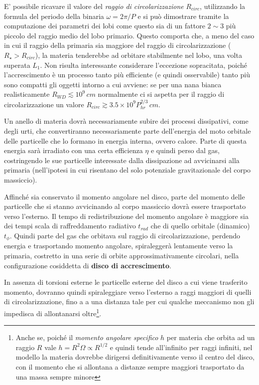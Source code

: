 \documentclass[a4paperbi]{article}
\begin{document}
	E' possibile ricavare il valore del \textit{raggio di circolarizzazione} $R_{circ}$, utilizzando la formula del periodo della binaria $\omega=2\pi/P$ e si può dimostrare tramite la computazione dei parametri dei lobi come questo sia di un fattore $2\sim3$ più piccolo del raggio medio del lobo primario. Questo comporta che, a meno del caso in cui il raggio della primaria sia maggiore del raggio di circolarizzazione ($R_\star>R_{circ}$), la materia tenderebbe ad orbitare stabilmente nel lobo, una volta superata $L_1$.
	Non risulta interessante considerare l'eccezione sopracitata, poiché l'accrescimento è un processo tanto più efficiente (e quindi osservabile) tanto più sono compatti gli oggetti intorno a cui avviene: se per una nana bianca realisticamente $R_{WD}\lesssim10^9\,cm$ normalmente ci si aspetta per il raggio di circolarizzazione un valore $R_{circ}\gtrsim3.5\times10^9P_{hr}^{2/3}\,cm$.

	Un anello di materia dovrà necessariamente subire dei processi dissipativi, come degli urti, che convertiranno necessariamente parte dell'energia del moto orbitale delle particelle che lo formano in energia interna, ovvero calore. Parte di questa energia sarà irradiato con una certa efficienza $\eta$ e quindi perso dal gas, costringendo le sue particelle interessate dalla dissipazione ad avvicinarsi alla primaria (nell'ipotesi in cui risentano del solo potenziale gravitazionale del corpo massiccio). 
	
	Affinché sia conservato il momento angolare nel disco, parte del momento delle particelle che si stanno avvicinando al corpo massiccio dovrà essere trasportato verso l'esterno. Il tempo di redistribuzione del momento angolare è maggiore sia dei tempi scala di raffreddamento radiativo $t_{rad}$ che di quello orbitale (dinamico) $t_{\phi}$. Quindi parte del gas che orbitava sul raggio di circolarizzazione, perdendo energia e trasportando momento angolare, spiraleggerà lentamente verso la primaria, costretto in una serie di orbite approssimativamente circolari, nella configurazione cosiddetta di \textbf{disco di accrescimento}. 	
	
	In assenza di torsioni esterne le particelle esterne del disco a cui viene trasferito momento, dovranno quindi spiraleggiare verso l'esterno a raggi maggiori di quelli di circolarizzazione, fino a a una distanza tale per cui qualche meccanismo non gli impedisca di allontanarsi oltre\footnote{Anche se, poiché il \textit{momento angolare specifico} $h$ per materia che orbita ad un raggio $R$ vale $h=R^2\Omega\propto R^{1/2}$ e quindi tende all'infinito per raggi infiniti, nel modello la materia dovrebbe dirigersi definitivamente verso il centro del disco, con il momento che si allontana a distanze sempre maggiori trasportato da una massa sempre minore}.
		
\end{document}

